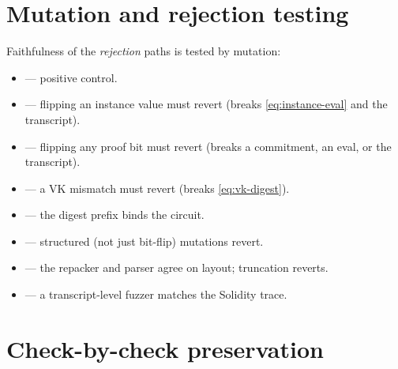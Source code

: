 \section{Mutation and rejection testing}
\label{sec:mutation}

Faithfulness of the \emph{rejection} paths is tested by mutation:
\begin{itemize}[leftmargin=1.4em,itemsep=2pt]
  \item {}
        --- positive control.
  \item {} --- flipping an
        instance value must revert (breaks \eqref{eq:instance-eval} and
        the transcript).
  \item {} --- flipping any
        proof bit must revert (breaks a commitment, an eval, or the
        transcript).
  \item {} --- a VK
        mismatch must revert (breaks \eqref{eq:vk-digest}).
  \item {} ---
        the digest prefix binds the circuit.
  \item {} ---
        structured (not just bit-flip) mutations revert.
  \item {} ---
        the repacker and parser agree on layout; truncation reverts.
  \item {}
        --- a transcript-level fuzzer matches the Solidity trace.
\end{itemize}

\section{Check-by-check preservation}
\label{sec:check-preservation}

